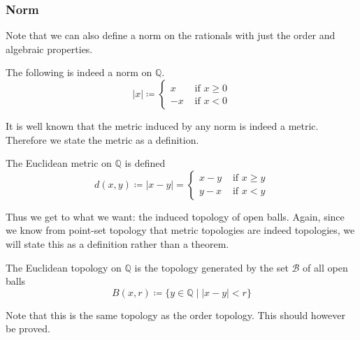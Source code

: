 \documentclass{article}
\begin{document}
    \subsubsection{Norm} 

      Note that we can also define a norm on the rationals with just the order and algebraic properties. 

      \begin{theorem} 
        The following is indeed a norm on $\mathbb{Q}$. 
        \begin{equation}
          |x| \coloneqq \begin{cases} x & \text{ if } x \geq 0 \\ -x & \text{ if } x < 0 \end{cases}
        \end{equation} 
      \end{theorem} 

      It is well known that the metric induced by any norm is indeed a metric. Therefore we state the metric as a definition. 

      \begin{definition}
        The Euclidean metric on $\mathbb{Q}$ is defined 
        \begin{equation}
          d(x, y) \coloneqq |x - y| = \begin{cases} x - y & \text{ if } x \geq y \\ y - x & \text{ if } x < y \end{cases}
        \end{equation}
      \end{definition}

      Thus we get to what we want: the induced topology of open balls. 
      Again, since we know from point-set topology that metric topologies are indeed topologies, we will state this as a definition rather than a theorem.  

      \begin{definition}
        The Euclidean topology on $\mathbb{Q}$ is the topology generated by the set $\mathscr{B}$ of all open balls
        \begin{equation}
          B(x, r) \coloneqq \{ y \in \mathbb{Q} \mid |x - y| < r \}
        \end{equation} 
      \end{definition}

      Note that this is the same topology as the order topology. This should however be proved. 
\end{document}
